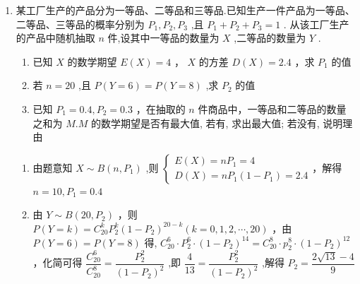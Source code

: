 \begin{enumerate}
\begin{enumerate}
\begin{jieda}
\begin{enumerate}
                \item 要使得计算机网络不会断掉，也就是要求能正常工作的设备至少有一台，即 $X \geq  1$ ，因此所求概率为 $P\left( {X \geq  1}\right)  = 1 - P\left( {X < 1}\right)  = 1 - P\left( {X = 0}\right)  = 1 - {0.008} = {0.992}$ .
            \end{enumerate}
        \end{jieda}
        \item 某工厂生产的产品分为一等品、二等品和三等品.已知生产一件产品为一等品、二等品、三等品的概率分别为 ${P}_{1},{P}_{2},{P}_{3}$ ,且 ${P}_{1} + {P}_{2} + {P}_{3} = 1$ . 从该工厂生产的产品中随机抽取 $n$ 件,设其中一等品的数量为 $X$ ,二等品的数量为 $Y$ .
        \begin{enumerate}
            \item 已知 $X$ 的数学期望 $E\left( X\right)  = 4$ ， $X$ 的方差 $D\left( X\right)  = {2.4}$ ，求 ${P}_{1}$ 的值
            \item 若 $n = {20}$ ,且 $P\left( {Y = 6}\right)  = P\left( {Y = 8}\right)$ ,求 ${P}_{2}$ 的值
            \item 已知 ${P}_{1} = {0.4},{P}_{2} = {0.3}$ ，在抽取的 $n$ 件商品中，一等品和二等品的数量之和为 $M.M$ 的数学期望是否有最大值, 若有, 求出最大值; 若没有, 说明理由
        \end{enumerate}
        \begin{jieda}
            \begin{enumerate}
                \item 由题意知 $X \sim  B\left( {n,{P}_{1}}\right)$ ,则 $\left\{  \begin{matrix} E\left( X\right)  = n{P}_{1} = 4 \\  D\left( X\right)  = n{P}_{1}\left( {1 - {P}_{1}}\right)  = {2.4} \end{matrix}\right.$，解得 $n = {10},{P}_{1} = {0.4}$ 
                
                \item 由 $Y \sim  B\left( {{20},{P}_{2}}\right)$ ，则 $P\left( {Y = k}\right)  = {{C}}_{20}^{k}{P}_{2}^{k}{\left( 1 - {P}_{2}\right) }^{{20} - k}\left( {k = 0,1,2,\cdots ,{20}}\right)$ ，由 $P\left( {Y = 6}\right)  = P\left( {Y = 8}\right)$ 得, ${{C}}_{20}^{6} \cdot  {P}_{2}^{6} \cdot  {\left( 1 - {P}_{2}\right) }^{14} = {{C}}_{20}^{8} \cdot  {p}_{2}^{8} \cdot  {\left( 1 - {P}_{2}\right) }^{12}$，化简可得 $\dfrac{{{C}}_{20 }^{6}}{{{C}}_{20 }^{8}} = \dfrac{{P}_{2}^{2}}{{\left( 1 - {P}_{2}\right) }^{2}}$ ,即 $\dfrac{4}{13} = \dfrac{{P}_{2}^{2}}{{\left( 1 - {P}_{2}\right) }^{2}}$ ,解得 ${P}_{2} = \dfrac{2\sqrt{13} - 4}{9}$ 
                

\end{enumerate}
\end{jieda}
\end{enumerate}
\end{enumerate}
